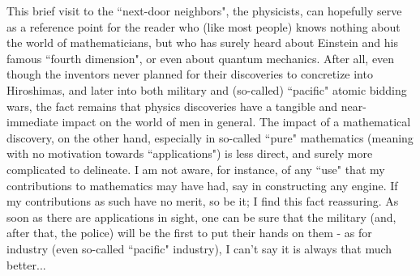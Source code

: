 This brief visit to the ``next-door neighbors", the physicists, can hopefully serve as a reference point for the reader who (like most people) knows nothing about the world of mathematicians, but who has surely heard about Einstein and his famous ``fourth dimension", or even about quantum mechanics. After all, even though the inventors never planned for their discoveries to concretize into Hiroshimas, and later into both military and (so-called) ``pacific" atomic bidding wars, the fact remains that physics discoveries have a tangible and near-immediate impact on the world of men in general. The impact of a mathematical discovery, on the other hand, especially in so-called ``pure" mathematics (meaning with no motivation towards ``applications") is less direct, and surely more complicated to delineate. I am not aware, for instance, of any ``use" that my contributions to mathematics may have had, say in constructing any engine. If my contributions as such have no merit, so be it; I find this fact reassuring. As soon as there are applications in sight, one can be sure that the military (and, after that, the police) will be the first to put their hands on them - as for industry (even so-called ``pacific" industry), I can't say it is always that much better...

